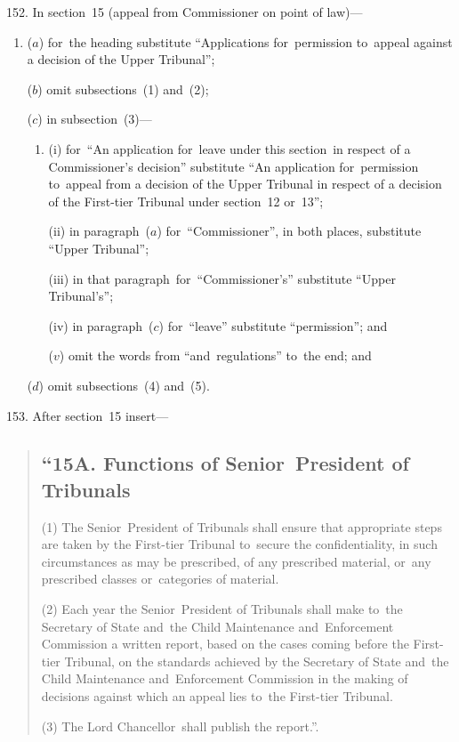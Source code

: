 \documentclass[12pt,a4paper]{article}
\begin{document}
\medskip

152.  In section~15 (appeal from Commissioner on point of law)—
\begin{enumerate}\item[]
($a$) for~the heading substitute “Applications for~permission to~appeal against a decision of the Upper Tribunal”;

($b$) omit subsections~(1) and~(2);

($c$) in subsection~(3)—
\begin{enumerate}\item[]
(i) for~“An application for~leave under this section~in respect of a Commissioner’s decision” substitute “An application for~permission to~appeal from a decision of the Upper Tribunal in respect of a decision of the First-tier Tribunal under section~12 or~13”;

(ii) in paragraph~($a$)  for~“Commissioner”, in both places, substitute “Upper Tribunal”;

(iii) in that paragraph~for~“Commissioner’s” substitute “Upper Tribunal’s”;

(iv)  in paragraph~($c$)  for~“leave” substitute “permission”; and

($v$)  omit the words from “and~regulations” to~the end; and
\end{enumerate}

($d$) omit subsections~(4) and~(5).
\end{enumerate}

\medskip

153.  After section~15 insert—
\begin{quotation}
\subsection*{\sloppy “15A.  Functions of Senior~President of Tribunals}

(1) The Senior~President of Tribunals shall ensure that appropriate steps are taken by the First-tier Tribunal to~secure the confidentiality, in such circumstances as may be prescribed, of any prescribed material, or~any prescribed classes or~categories of material.

(2) Each year the Senior~President of Tribunals shall make to~the Secretary of State and~the Child Maintenance and~Enforcement Commission a written report, based on the cases coming before the First-tier Tribunal, on the standards achieved by the Secretary of State and~the Child Maintenance and~Enforcement Commission in the making of decisions against which an appeal lies to~the First-tier Tribunal.

(3) The Lord Chancellor~shall publish the report.”.
\end{quotation}
\end{document}
